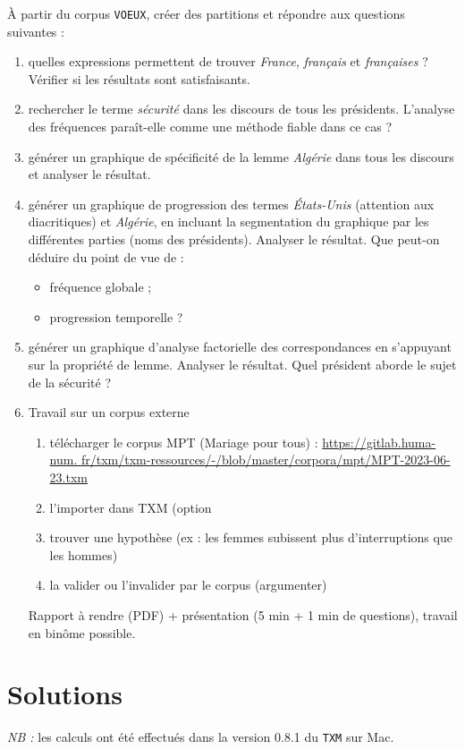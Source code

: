 \documentclass[xcolor={table,usenames,dvipsnames}]{article}
\begin{document}
	À partir du corpus \texttt{VOEUX}, créer des partitions et répondre aux questions suivantes :
	\begin{enumerate}
		\item quelles expressions permettent de trouver \textit{France}, \textit{français} et \textit{françaises} ? Vérifier si les résultats sont satisfaisants.
		\item rechercher le terme \textit{sécurité} dans les discours de tous les présidents. L'analyse des fréquences paraît-elle comme une méthode fiable dans ce cas ?
		\item générer un graphique de spécificité de la lemme \textit{Algérie} dans tous les discours et analyser le résultat.
		\item générer un graphique de progression des termes \textit{États-Unis} (attention aux diacritiques) et \textit{Algérie}, en incluant la segmentation du graphique par les différentes parties (noms des présidents). Analyser le résultat. Que peut-on déduire du point de vue de :
		\begin{itemize}
			\item fréquence globale ;
			\item progression temporelle ?
		\end{itemize}
		\item générer un graphique d'analyse factorielle des correspondances en s'appuyant sur la propriété de lemme. Analyser le résultat. Quel président aborde le sujet de la sécurité ?
		\item Travail sur un corpus externe
		\begin{enumerate}
					\item télécharger le corpus \textsc{MPT} (Mariage pour tous) : \url{https://gitlab.huma-num.
				fr/txm/txm-ressources/-/blob/master/corpora/mpt/MPT-2023-06-23.txm}
			\item l'importer dans \textsc{TXM} (option 
			\item trouver une hypothèse (ex : les femmes subissent plus d’interruptions que les hommes)
			\item la valider ou l’invalider par le corpus (argumenter)
		\end{enumerate}
		Rapport à rendre (PDF) + présentation (5 min + 1 min de questions), travail en binôme possible.
	\end{enumerate}
	
	\bigskip
	
\section{Solutions}
\textit{NB :} les calculs ont été effectués dans la version \textsc{0.8.1} du \texttt{TXM} sur Mac.
\end{document}
